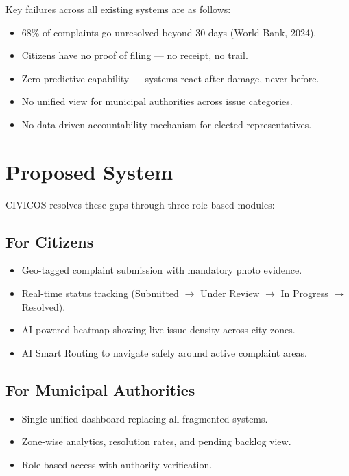 \documentclass[12pt,a4paper]{report}
\begin{document}
Key failures across all existing systems are as follows:

\begin{itemize}
    \item 68\% of complaints go unresolved beyond 30 days
    (World Bank, 2024).
    \item Citizens have no proof of filing --- no receipt, no trail.
    \item Zero predictive capability --- systems react after damage,
    never before.
    \item No unified view for municipal authorities across issue categories.
    \item No data-driven accountability mechanism for elected representatives.
\end{itemize}

\section{Proposed System}

CIVICOS resolves these gaps through three role-based modules:

\subsection{For Citizens}

\begin{itemize}
    \item Geo-tagged complaint submission with mandatory photo evidence.
    \item Real-time status tracking (Submitted $\rightarrow$ Under Review
    $\rightarrow$ In Progress $\rightarrow$ Resolved).
    \item AI-powered heatmap showing live issue density across city zones.
    \item AI Smart Routing to navigate safely around active complaint areas.
\end{itemize}

\subsection{For Municipal Authorities}

\begin{itemize}
    \item Single unified dashboard replacing all fragmented systems.
    \item Zone-wise analytics, resolution rates, and pending backlog view.
    \item Role-based access with authority verification.
\end{itemize}
\end{document}
